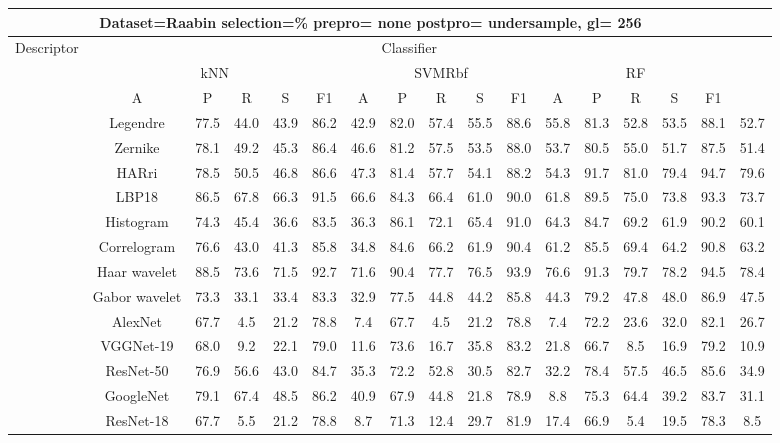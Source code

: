 \documentclass[12pt,italian]{article}
\begin{document}
\begin{tiny}
\begin{longtable}{lcccccccccccccccc}
\toprule
\multicolumn{16}{c}{Dataset=Raabin selection=\% prepro= none postpro= undersample, gl= 256} \\ 
\toprule
Descriptor & \multicolumn{15}{c}{Classifier} \\ 
& \multicolumn{5}{c}{kNN} & \multicolumn{5}{c}{SVMRbf} & \multicolumn{5}{c}{RF} \\ 
& A & P & R & S & F1 & A & P & R & S & F1 & A & P & R & S & F1 \\ 
\midrule
& Legendre & 77.5 & 44.0 & 43.9 & 86.2 & 42.9 & 82.0 & 57.4 & 55.5 & 88.6 & 55.8 & 81.3 & 52.8 & 53.5 & 88.1 & 52.7 \\ 
& Zernike & 78.1 & 49.2 & 45.3 & 86.4 & 46.6 & 81.2 & 57.5 & 53.5 & 88.0 & 53.7 & 80.5 & 55.0 & 51.7 & 87.5 & 51.4 \\ 
& HARri & 78.5 & 50.5 & 46.8 & 86.6 & 47.3 & 81.4 & 57.7 & 54.1 & 88.2 & 54.3 & 91.7 & 81.0 & 79.4 & 94.7 & 79.6 \\ 
& LBP18 & 86.5 & 67.8 & 66.3 & 91.5 & 66.6 & 84.3 & 66.4 & 61.0 & 90.0 & 61.8 & 89.5 & 75.0 & 73.8 & 93.3 & 73.7 \\ 
& Histogram & 74.3 & 45.4 & 36.6 & 83.5 & 36.3 & 86.1 & 72.1 & 65.4 & 91.0 & 64.3 & 84.7 & 69.2 & 61.9 & 90.2 & 60.1 \\ 
& Correlogram & 76.6 & 43.0 & 41.3 & 85.8 & 34.8 & 84.6 & 66.2 & 61.9 & 90.4 & 61.2 & 85.5 & 69.4 & 64.2 & 90.8 & 63.2 \\ 
& Haar wavelet & 88.5 & 73.6 & 71.5 & 92.7 & 71.6 & 90.4 & 77.7 & 76.5 & 93.9 & 76.6 & 91.3 & 79.7 & 78.2 & 94.5 & 78.4 \\ 
& Gabor wavelet & 73.3 & 33.1 & 33.4 & 83.3 & 32.9 & 77.5 & 44.8 & 44.2 & 85.8 & 44.3 & 79.2 & 47.8 & 48.0 & 86.9 & 47.5 \\ 
& AlexNet & 67.7 &  4.5 & 21.2 & 78.8 &  7.4 & 67.7 &  4.5 & 21.2 & 78.8 &  7.4 & 72.2 & 23.6 & 32.0 & 82.1 & 26.7 \\ 
& VGGNet-19 & 68.0 &  9.2 & 22.1 & 79.0 & 11.6 & 73.6 & 16.7 & 35.8 & 83.2 & 21.8 & 66.7 &  8.5 & 16.9 & 79.2 & 10.9 \\ 
& ResNet-50 & 76.9 & 56.6 & 43.0 & 84.7 & 35.3 & 72.2 & 52.8 & 30.5 & 82.7 & 32.2 & 78.4 & 57.5 & 46.5 & 85.6 & 34.9 \\ 
& GoogleNet & 79.1 & 67.4 & 48.5 & 86.2 & 40.9 & 67.9 & 44.8 & 21.8 & 78.9 &  8.8 & 75.3 & 64.4 & 39.2 & 83.7 & 31.1 \\ 
& ResNet-18 & 67.7 &  5.5 & 21.2 & 78.8 &  8.7 & 71.3 & 12.4 & 29.7 & 81.9 & 17.4 & 66.9 &  5.4 & 19.5 & 78.3 &  8.5 \\ 

\end{longtable}
\end{tiny}
\end{document}
